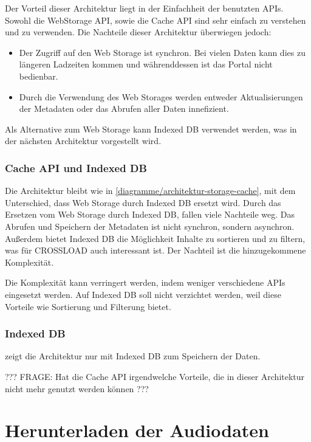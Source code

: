 Der Vorteil dieser Architektur liegt in der Einfachheit der benutzten \acp{API}. Sowohl die WebStorage \ac{API}, sowie die Cache \ac{API} sind sehr einfach zu verstehen und zu verwenden. Die Nachteile dieser Architektur überwiegen jedoch:

\begin{itemize}
\item Der Zugriff auf den Web Storage ist synchron. Bei vielen Daten kann dies zu längeren Ladzeiten kommen und währenddessen ist das Portal nicht bedienbar. 
\item Durch die Verwendung des Web Storages werden entweder Aktualisierungen der Metadaten oder das Abrufen aller Daten innefizient. 
\end{itemize}

Als Alternative zum Web Storage kann Indexed DB verwendet werden, was in der nächsten Architektur vorgestellt wird.

\subsubsection{Cache API und Indexed DB}
Die Architektur bleibt wie in \autoref{diagramme/architektur-storage-cache}, mit dem Unterschied, dass Web Storage durch Indexed DB ersetzt wird. Durch das Ersetzen vom Web Storage durch Indexed DB, fallen viele Nachteile weg. Das Abrufen und Speichern der Metadaten ist nicht synchron, sondern asynchron. Außerdem bietet Indexed DB die Möglichkeit Inhalte zu sortieren und zu filtern, was für CROSSLOAD auch interessant ist. Der Nachteil ist die hinzugekommene Komplexität. 

Die Komplexität kann verringert werden, indem weniger verschiedene \acp{API} eingesetzt werden. Auf Indexed DB soll nicht verzichtet werden, weil diese Vorteile wie Sortierung und Filterung bietet. 

\subsubsection{Indexed DB}
 zeigt die Architektur nur mit Indexed DB zum Speichern der Daten. 

??? FRAGE: Hat die Cache API irgendwelche Vorteile, die in dieser Architektur nicht mehr genutzt werden können ???

\section{Herunterladen der Audiodaten}

